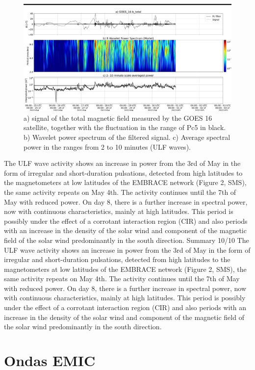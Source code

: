 \documentclass[11pt, oneside]{article}
\begin{document}
                     \begin{figure}[H]
    
                        \centering
   
                             \includegraphics[width=14cm]{./figures//figureULF_2.png}

                             \caption{a) signal of the total magnetic field 
                              measured by the GOES 16 satellite, together with the 
                              fluctuation in the range of Pc5 in black. b) Wavelet 
                              power spectrum of the filtered signal. c) Average 
                              spectral power in the ranges from 2 to 10 minutes 
                              (ULF waves).}
                        \end{figure}

                     The ULF wave activity shows an increase in power from the 3rd of May in
the form of irregular and short-duration pulsations, detected from high
latitudes to the magnetometers at low latitudes of the EMBRACE network
(Figure 2, SMS), the same activity repeats on May 4th. The activity continues
until the 7th of May with reduced power. On day 8, there is a further
increase in spectral power, now with continuous characteristics, mainly at
high latitudes. This period is possibly under the effect of a corrotant
interaction region (CIR) and also periods with an increase in the density of
the solar wind and component of the magnetic field of the solar wind
predominantly in the south direction.
Summary
10/10
The ULF wave activity shows an increase in power from the 3rd of May in the form of irregular and short-duration pulsations, detected from high latitudes to the magnetometers at low latitudes of the EMBRACE network (Figure 2, SMS), the same activity repeats on May 4th. The activity continues until the 7th of May with reduced power. On day 8, there is a further increase in spectral power, now with continuous characteristics, mainly at high latitudes. This period is possibly under the effect of a corrotant interaction region (CIR) and also periods with an increase in the density of the solar wind and component of the magnetic field of the solar wind predominantly in the south direction.\section{Ondas EMIC} 
\end{document}
